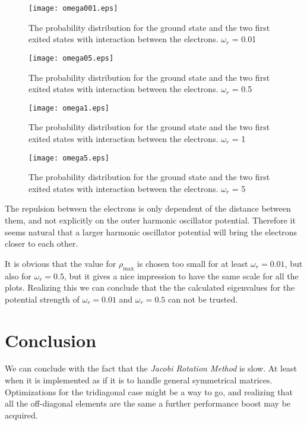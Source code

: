 \documentclass[11pt, a4paper]{article}
\begin{document}
\begin{figure}[ht!]
\texttt{[image: omega001.eps]}
\caption{The probability distribution for the ground state and the two first exited states with interaction between the electrons. $\omega_r$ = 0.01}
\end{figure}

\begin{figure}[ht!]
\texttt{[image: omega05.eps]}
\caption{The probability distribution for the ground state and the two first exited states with interaction between the electrons. $\omega_r$ = 0.5}
\end{figure}

\begin{figure}[ht!]
\texttt{[image: omega1.eps]}
\caption{The probability distribution for the ground state and the two first exited states with interaction between the electrons. $\omega_r$ = 1}
\end{figure}

\begin{figure}[ht!]
\texttt{[image: omega5.eps]}
\caption{The probability distribution for the ground state and the two first exited states with interaction between the electrons. $\omega_r$ = 5}
\end{figure}
The repulsion between the electrons is only dependent of the distance between them, and not explicitly on the outer harmonic oscillator potential. Therefore it seems natural that a larger harmonic oscillator potential will bring the electrons closer to each other. 

It is obvious that the value for $\rho_\text{max}$ is chosen too small for at least $\omega_r = 0.01$, but also for $\omega_r = 0.5$, but it gives a nice impression to have the same scale for all the plots. Realizing this we can conclude that the the calculated eigenvalues for the potential strength of $\omega_r = 0.01$ and $\omega_r = 0.5$ can not be trusted.
\clearpage

\section{Conclusion}
We can conclude with the fact that the \textit{Jacobi Rotation Method} is slow. At least when it is implemented as if it is to handle general symmetrical matrices. Optimizations for the tridiagonal case might be a way to go, and realizing that all the off-diagonal elements are the same a further performance boost may be acquired. 
\end{document}
